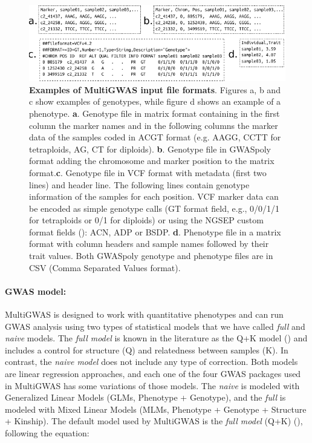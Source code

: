 \documentclass{article}
\begin{document}
\begin{figure}[H]
\begin{centering}
\includegraphics{03_figure-input-files} 
\par\end{centering}
\caption{\textbf{Examples of MultiGWAS input file formats}. Figures a, b and c show examples of genotypes, while figure d shows an example of a phenotype. \textbf{a}. Genotype file in matrix format containing in the first column the marker names and in the following columns the marker data of the samples coded in \textquotedbl{}ACGT\textquotedbl{} format (e.g. AAGG, CCTT for tetraploids, AG, CT for diploids). \textbf{b}. Genotype file in GWASpoly format adding the chromosome and marker position to the matrix format.\textbf{c}. Genotype file in VCF format with metadata (first two lines) and header line. The following lines contain genotype information of the samples for each position. VCF marker data can be encoded as simple genotype calls (GT format field, e.g., 0/0/1/1 for tetraploids or 0/1 for diploids) or using the NGSEP custom format fields (\cite{Duitama2019}): ACN, ADP or BSDP. \textbf{d}. Phenotype file in a matrix format with column headers and sample names followed by their trait values. Both GWASpoly genotype and phenotype files are in CSV (Comma Separated Values format).}
\label{fig:File-Formats}\protect 
\end{figure}





\paragraph{GWAS model:}

MultiGWAS is designed to work with quantitative phenotypes and can run GWAS analysis using two types of statistical models that we have called \emph{full} and \emph{naive} models. The \emph{full model} is known in the literature as the Q+K model (\cite{Yu2006}) and includes a control for structure (Q) and relatedness between samples (K). In contrast, the \emph{naive model} does not include any type of correction. Both models are linear regression approaches, and each one of the four GWAS packages used in MultiGWAS has some variations of those models. The \emph{naive} is modeled with Generalized Linear Models (GLMs, Phenotype + Genotype), and the \emph{full} is modeled with Mixed Linear Models (MLMs, Phenotype + Genotype + Structure + Kinship). The default model used by MultiGWAS is the \emph{full model} (Q+K) (\cite{Yu2006}), following the equation:
\end{document}
